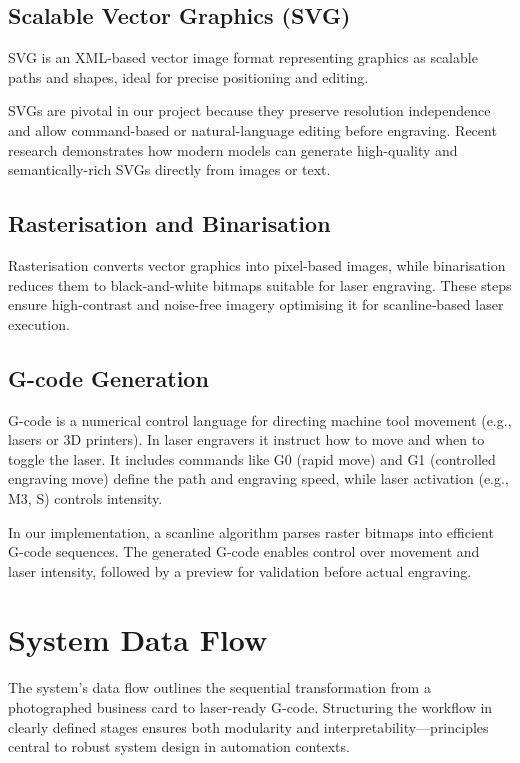 \subsection{Scalable Vector Graphics (SVG)}
SVG is an XML-based vector image format representing graphics as scalable paths and shapes, ideal for precise positioning and editing.

SVGs are pivotal in our project because they preserve resolution independence and allow command-based or natural-language editing before engraving. Recent research demonstrates how modern models can generate high-quality and semantically-rich SVGs directly from images or text. \cite{StarVector:Arxiv2312.11556v4}

\subsection{Rasterisation and Binarisation}
Rasterisation converts vector graphics into pixel-based images, while binarisation reduces them to black-and-white bitmaps suitable for laser engraving. These steps ensure high-contrast and noise-free imagery optimising it for scanline‑based laser execution.

\subsection{G-code Generation}
G-code is a numerical control language for directing machine tool movement (e.g., lasers or 3D printers). In laser engravers it instruct how to move and when to toggle the laser. It includes commands like G0 (rapid move) and G1 (controlled engraving move) define the path and engraving speed, while laser activation (e.g., M3, S) controls intensity. \cite{Yang:SVGtoGcode2021}

In our implementation, a scanline algorithm parses raster bitmaps into efficient G-code sequences. The generated G-code enables control over movement and laser intensity, followed by a preview for validation before actual engraving.

	
\section{System Data Flow}

The system’s data flow outlines the sequential transformation from a photographed business card to laser-ready G-code. Structuring the workflow in clearly defined stages ensures both modularity and interpretability—principles central to robust system design in automation contexts.

